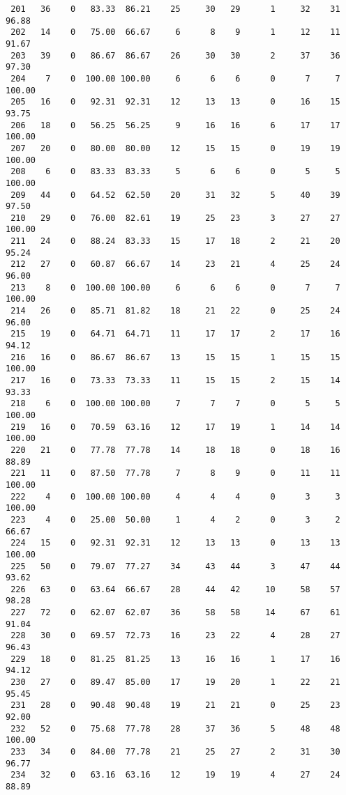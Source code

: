 \begin{verbatim}
 201   36    0   83.33  86.21    25     30   29      1     32    31    96.88
 202   14    0   75.00  66.67     6      8    9      1     12    11    91.67
 203   39    0   86.67  86.67    26     30   30      2     37    36    97.30
 204    7    0  100.00 100.00     6      6    6      0      7     7   100.00
 205   16    0   92.31  92.31    12     13   13      0     16    15    93.75
 206   18    0   56.25  56.25     9     16   16      6     17    17   100.00
 207   20    0   80.00  80.00    12     15   15      0     19    19   100.00
 208    6    0   83.33  83.33     5      6    6      0      5     5   100.00
 209   44    0   64.52  62.50    20     31   32      5     40    39    97.50
 210   29    0   76.00  82.61    19     25   23      3     27    27   100.00
 211   24    0   88.24  83.33    15     17   18      2     21    20    95.24
 212   27    0   60.87  66.67    14     23   21      4     25    24    96.00
 213    8    0  100.00 100.00     6      6    6      0      7     7   100.00
 214   26    0   85.71  81.82    18     21   22      0     25    24    96.00
 215   19    0   64.71  64.71    11     17   17      2     17    16    94.12
 216   16    0   86.67  86.67    13     15   15      1     15    15   100.00
 217   16    0   73.33  73.33    11     15   15      2     15    14    93.33
 218    6    0  100.00 100.00     7      7    7      0      5     5   100.00
 219   16    0   70.59  63.16    12     17   19      1     14    14   100.00
 220   21    0   77.78  77.78    14     18   18      0     18    16    88.89
 221   11    0   87.50  77.78     7      8    9      0     11    11   100.00
 222    4    0  100.00 100.00     4      4    4      0      3     3   100.00
 223    4    0   25.00  50.00     1      4    2      0      3     2    66.67
 224   15    0   92.31  92.31    12     13   13      0     13    13   100.00
 225   50    0   79.07  77.27    34     43   44      3     47    44    93.62
 226   63    0   63.64  66.67    28     44   42     10     58    57    98.28
 227   72    0   62.07  62.07    36     58   58     14     67    61    91.04
 228   30    0   69.57  72.73    16     23   22      4     28    27    96.43
 229   18    0   81.25  81.25    13     16   16      1     17    16    94.12
 230   27    0   89.47  85.00    17     19   20      1     22    21    95.45
 231   28    0   90.48  90.48    19     21   21      0     25    23    92.00
 232   52    0   75.68  77.78    28     37   36      5     48    48   100.00
 233   34    0   84.00  77.78    21     25   27      2     31    30    96.77
 234   32    0   63.16  63.16    12     19   19      4     27    24    88.89

\end{verbatim}

